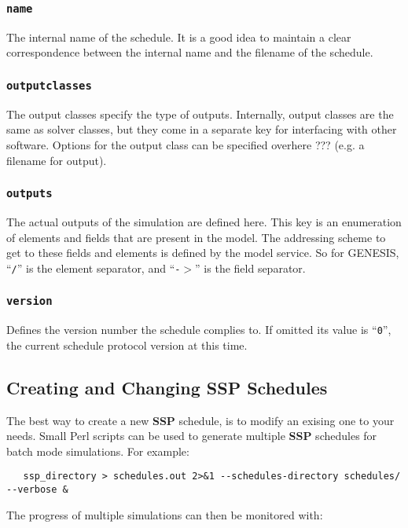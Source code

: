 \documentclass[12pt]{article}
\begin{document}
\subsubsection*{\tt name}

The internal name of the schedule. It is a good idea to maintain a clear correspondence between the internal name and the filename of the schedule. 

\subsubsection*{\tt outputclasses}

The output classes specify the type of outputs. Internally, output classes are the same as solver classes, but they come in a separate key for interfacing with other software. Options for the output class can be specified overhere ??? (e.g. a filename for output). 

\subsubsection*{\tt outputs}

The actual outputs of the simulation are defined here. This key is an enumeration of elements and fields that are present in the model. The addressing scheme to get to these fields and elements is defined by the model service. So for GENESIS, ``{\tt /}'' is the element separator, and ``{\tt -$>$}'' is the field separator. 

\subsubsection*{\tt version}

Defines the version number the schedule complies to. If omitted its value is ``{\tt 0}'', the current schedule protocol version at this time. 

\subsection*{Creating and Changing SSP Schedules}

The best way to create a new {\bf SSP} schedule, is to modify an exising one to your needs. Small Perl scripts can be used to generate multiple {\bf SSP} schedules for batch mode simulations. For example:

\begin{verbatim}
   ssp_directory > schedules.out 2>&1 --schedules-directory schedules/ --verbose &
\end{verbatim}
The progress of multiple simulations can then be monitored with:
\end{document}
